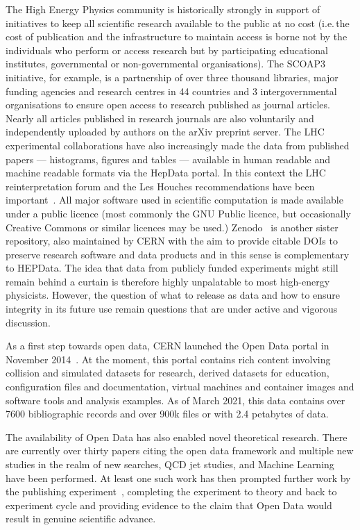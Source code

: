\documentclass[10pt]{article}
\begin{document}
The High Energy Physics community is historically strongly in support of initiatives to keep all scientific research available to the public at no cost (i.e.\,the cost of publication and the infrastructure to maintain access is borne not by the individuals who perform or access research but by participating educational institutes, governmental or non-governmental organisations).  The SCOAP3 initiative, for example, is a partnership of over three thousand libraries, major funding agencies and research centres in 44 countries and 3 intergovernmental organisations to ensure open access to research published as journal articles.  Nearly all articles published in research journals are also voluntarily and independently uploaded by authors on the arXiv preprint server.  The LHC experimental collaborations have also increasingly made  the data from published papers ---  histograms, figures and tables --- available in human readable and machine readable formats via the HepData portal. In this context the LHC reinterpretation forum and the Les Houches recommendations have been important~\cite{LHCReinterpretationForum:2020xtr,Kraml:2012sg}.  All major software used in scientific computation is made available under a public licence (most commonly the GNU Public licence, but occasionally Creative Commons or similar licences may be used.)  Zenodo~\cite{zenodo} is another sister repository, also maintained by CERN with the aim to provide citable DOIs to preserve research software and data products and in this sense is complementary to HEPData.  The idea that data from publicly funded experiments might still remain behind a curtain is therefore highly unpalatable to most high-energy physicists.  However, the question of what to release as data and how to ensure integrity in its future use remain questions that are under active and vigorous discussion.

As a first step towards open data, CERN launched the Open Data portal in November 2014~\cite{CODP}. At the moment, this portal contains rich content involving collision and simulated datasets for research, derived datasets for education, configuration files and documentation, virtual machines and container images and software tools and analysis examples. As of March 2021, this data contains over 7600 bibliographic records and over 900k files or with 2.4 petabytes of data.

The availability of Open Data has also enabled novel theoretical research.  There are currently over thirty papers citing the open data framework and multiple new studies in the realm of new searches, QCD jet studies, and Machine Learning~\cite{Cesarotti:2019nax, Andrews:2018nwy, Larkoski:2017bvj} have been performed.  At least one such work has then prompted further work by the publishing experiment~\cite{CMS:2017qlm}, completing the experiment to theory and back to experiment cycle and providing evidence to the claim that Open Data would result in genuine scientific advance.
\end{document}

